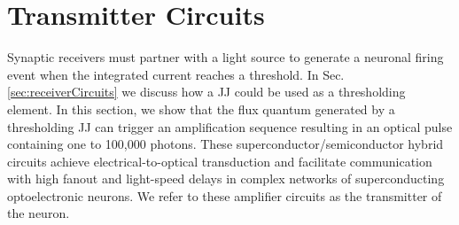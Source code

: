 \documentclass[twocolumn]{article}
\begin{document}
\section{\label{sec:transmitterCircuits}Transmitter Circuits}
%	
Synaptic receivers must partner with a light source to generate a neuronal firing event when the integrated current reaches a threshold. In Sec.\,\ref{sec:receiverCircuits} we discuss how a JJ could be used as a thresholding element. In this section, we show that the flux quantum generated by a thresholding JJ can trigger an amplification sequence resulting in an optical pulse containing one to 100,000 photons. These superconductor/semiconductor hybrid circuits achieve electrical-to-optical transduction and facilitate communication with high fanout and light-speed delays in complex networks of superconducting optoelectronic neurons. We refer to these amplifier circuits as the transmitter of the neuron.
\end{document}
